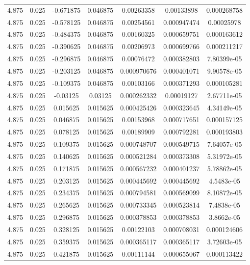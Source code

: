 \begin{table}[bh]
\begin{center}
{\begin{tabular}{ccccccc}
4.875	 & 0.025 & 	-0.671875	 & 0.046875	 & 0.00263358	 & 0.00133898	 & 0.000268758 \\ 
4.875	 & 0.025 & 	-0.578125	 & 0.046875	 & 0.00254561	 & 0.000947474	 & 0.00025978 \\ 
4.875	 & 0.025 & 	-0.484375	 & 0.046875	 & 0.00160325	 & 0.000659751	 & 0.000163612 \\ 
4.875	 & 0.025 & 	-0.390625	 & 0.046875	 & 0.00206973	 & 0.000699766	 & 0.000211217 \\ 
4.875	 & 0.025 & 	-0.296875	 & 0.046875	 & 0.00076472	 & 0.000382803	 & 7.80399e-05 \\ 
4.875	 & 0.025 & 	-0.203125	 & 0.046875	 & 0.000970676	 & 0.000401071	 & 9.90578e-05 \\ 
4.875	 & 0.025 & 	-0.109375	 & 0.046875	 & 0.00103166	 & 0.000371293	 & 0.000105281 \\ 
4.875	 & 0.025 & 	-0.03125	 & 0.03125	 & 0.000262332	 & 0.00019127	 & 2.67711e-05 \\ 
4.875	 & 0.025 & 	0.015625	 & 0.015625	 & 0.000425426	 & 0.000323645	 & 4.34149e-05 \\ 
4.875	 & 0.025 & 	0.046875	 & 0.015625	 & 0.00153968	 & 0.000717651	 & 0.000157125 \\ 
4.875	 & 0.025 & 	0.078125	 & 0.015625	 & 0.00189909	 & 0.000792281	 & 0.000193803 \\ 
4.875	 & 0.025 & 	0.109375	 & 0.015625	 & 0.000748707	 & 0.000549715	 & 7.64057e-05 \\ 
4.875	 & 0.025 & 	0.140625	 & 0.015625	 & 0.000521284	 & 0.000373308	 & 5.31972e-05 \\ 
4.875	 & 0.025 & 	0.171875	 & 0.015625	 & 0.000567232	 & 0.000401237	 & 5.78862e-05 \\ 
4.875	 & 0.025 & 	0.203125	 & 0.015625	 & 0.000445692	 & 0.000445692	 & 4.5483e-05 \\ 
4.875	 & 0.025 & 	0.234375	 & 0.015625	 & 0.000794581	 & 0.000569099	 & 8.10872e-05 \\ 
4.875	 & 0.025 & 	0.265625	 & 0.015625	 & 0.000733345	 & 0.000523814	 & 7.4838e-05 \\ 
4.875	 & 0.025 & 	0.296875	 & 0.015625	 & 0.000378853	 & 0.000378853	 & 3.8662e-05 \\ 
4.875	 & 0.025 & 	0.328125	 & 0.015625	 & 0.00122103	 & 0.000708031	 & 0.000124606 \\ 
4.875	 & 0.025 & 	0.359375	 & 0.015625	 & 0.000365117	 & 0.000365117	 & 3.72603e-05 \\ 
4.875	 & 0.025 & 	0.421875	 & 0.015625	 & 0.00111144	 & 0.000655067	 & 0.000113422 \\ 

\end{tabular}}
\end{center}
\end{table}
